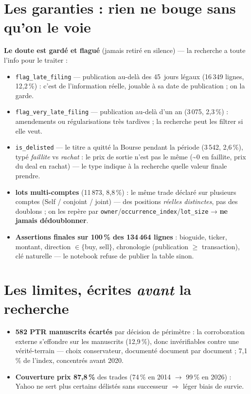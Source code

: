 \documentclass[10pt,a4paper]{article}
\newcommand{\code}[1]{\texttt{\small #1}}
\begin{document}
\section{Les garanties : rien ne bouge sans qu'on le voie}

\textbf{Le doute est gardé et flagué} (jamais retiré en silence) --- la recherche a toute l'info pour le
traiter :
\begin{itemize}
\item \code{flag\_late\_filing} --- publication au-delà des 45~jours légaux (16\,349 lignes, 12{,}2\,\%) :
      c'est de l'information réelle, jouable à sa date de publication ; on la garde.
\item \code{flag\_very\_late\_filing} --- publication au-delà d'un an (3\,075, 2{,}3\,\%) : amendements ou
      régularisations très tardives ; la recherche peut les filtrer si elle veut.
\item \code{is\_delisted} --- le titre a quitté la Bourse pendant la période (3\,542, 2{,}6\,\%), typé
      \emph{faillite} vs \emph{rachat} : le prix de sortie n'est pas le même (\textasciitilde 0 en
      faillite, prix du deal en rachat) --- le type indique à la recherche quelle valeur finale prendre.
\item \textbf{lots multi-comptes} (11\,873, 8{,}8\,\%) : le même trade déclaré sur plusieurs comptes
      (Self / conjoint / joint) --- des positions \emph{réelles distinctes}, pas des doublons ; on les
      repère par \code{owner}/\code{occurrence\_index}/\code{lot\_size} → \textbf{ne jamais dédoublonner}.
\item \textbf{Assertions finales sur 100\,\% des 134\,464 lignes} : bioguide, ticker, montant, direction
      $\in\{$buy, sell$\}$, chronologie (publication $\geq$ transaction), clé naturelle --- le notebook
      refuse de publier la table sinon.
\end{itemize}

\section{Les limites, écrites \emph{avant} la recherche}

\begin{itemize}
\item \textbf{582 PTR manuscrits écartés} par décision de périmètre : la corroboration externe
      s'effondre sur les manuscrits (12{,}9\,\%), donc invérifiables contre une vérité-terrain --- choix
      conservateur, documenté document par document ; 7{,}1\,\% de l'index, concentrés avant 2020.
\item \textbf{Couverture prix 87{,}8\,\%} des trades (74\,\% en 2014 $\to$ 99\,\% en 2026) : Yahoo ne
      sert plus certains délistés sans successeur $\Rightarrow$ léger biais de survie.
\end{itemize}
\end{document}
